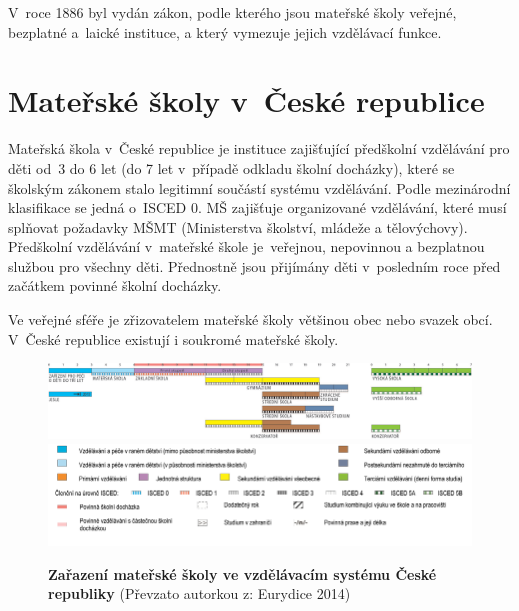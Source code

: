 		V roce 1886 byl vydán zákon, podle kterého jsou mateřské školy veřejné, bezplatné a laické instituce, a který vymezuje jejich vzdělávací funkce.

	\section{Mateřské školy v~České republice}


		Mateřská škola v České republice je instituce zajišťující předškolní vzdělávání pro děti od 3 do 6 let (do 7 let v případě odkladu školní docházky), které se školským zákonem stalo legitimní součástí systému vzdělávání. Podle mezinárodní klasifikace se jedná o ISCED 0. MŠ zajišťuje organizované vzdělávání, které musí splňovat požadavky MŠMT (Ministerstva školství, mládeže a tělovýchovy). Předškolní vzdělávání v~mateřské škole je veřejnou, nepovinnou a bezplatnou službou pro všechny děti. Přednostně jsou přijímány děti v posledním roce před začátkem povinné školní docházky. 
		
		\noindent
		Ve veřejné sféře je zřizovatelem mateřské školy většinou obec nebo svazek obcí. V České republice existují i soukromé mateřské školy.
		
		\begin{figure} [t]
			\center
			\includegraphics[width=1.0\linewidth]{fotky/msCR.png} \\
			\includegraphics[width=1.0\linewidth]{fotky/msVysvetlivky.png}
			\caption{ \textbf{Zařazení mateřské školy ve vzdělávacím systému České republiky}
			(Převzato autorkou z: Eurydice 2014)
			}
			\label{obr:msCR}
		\end{figure}


